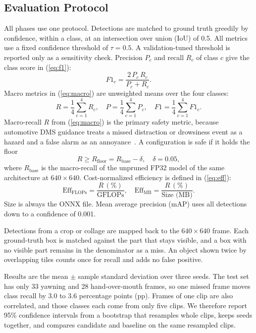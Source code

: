\documentclass[conference]{IEEEtran}
\begin{document}
\subsection{Evaluation Protocol}
\label{sec:protocol}
All phases use one protocol. Detections are matched to ground truth greedily by confidence, within a class, at an intersection over union (IoU) of 0.5. All metrics use a fixed confidence threshold of $\tau=0.5$. A validation-tuned threshold is reported only as a sensitivity check. Precision $P_c$ and recall $R_c$ of class $c$ give the class score in (\ref{eq:f1}):
\begin{equation}
\label{eq:f1}
F1_c = \frac{2\,P_c\,R_c}{P_c + R_c}.
\end{equation}
Macro metrics in (\ref{eq:macro}) are unweighted means over the four classes:
\begin{equation}
\label{eq:macro}
R = \frac{1}{4}\sum_{c=1}^{4} R_c, \quad
P = \frac{1}{4}\sum_{c=1}^{4} P_c, \quad
F1 = \frac{1}{4}\sum_{c=1}^{4} F1_c.
\end{equation}
Macro-recall $R$ from (\ref{eq:macro}) is the primary safety metric, because automotive DMS guidance treats a missed distraction or drowsiness event as a hazard and a false alarm as an annoyance~\cite{euroncap2026driver,isots5283}. A configuration is safe if it holds the floor
\begin{equation}
\label{eq:floor}
R \geq R_{\text{floor}} = R_{\text{base}} - \delta, \quad \delta = 0.05,
\end{equation}
where $R_{\text{base}}$ is the macro-recall of the unpruned FP32 model of the same architecture at $640\times640$. Cost-normalized efficiency is defined in (\ref{eq:eff}):
\begin{equation}
\label{eq:eff}
\text{Eff}_{\text{FLOPs}} = \frac{R\,(\%)}{\text{GFLOPs}}, \quad
\text{Eff}_{\text{MB}} = \frac{R\,(\%)}{\text{Size (MB)}}.
\end{equation}
Size is always the ONNX file. Mean average precision (mAP) uses all detections down to a confidence of 0.001.

Detections from a crop or collage are mapped back to the $640\times640$ frame. Each ground-truth box is matched against the part that stays visible, and a box with no visible part remains in the denominator as a miss. An object shown twice by overlapping tiles counts once for recall and adds no false positive.

Results are the mean $\pm$ sample standard deviation over three seeds. The test set has only 33 yawning and 28 hand-over-mouth frames, so one missed frame moves class recall by 3.0 to 3.6 percentage points (pp). Frames of one clip are also correlated, and those classes each come from only five clips. We therefore report 95\% confidence intervals from a bootstrap that resamples whole clips, keeps seeds together, and compares candidate and baseline on the same resampled clips.
\end{document}
